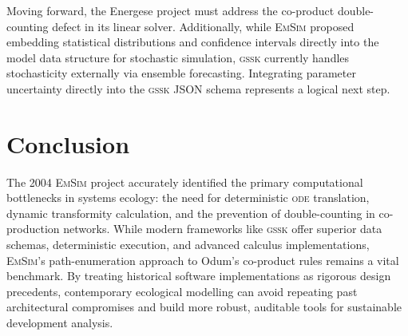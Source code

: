 \documentclass[3p,times,authoryear]{elsarticle}
\newcommand{\gssk}{\textsc{gssk}}
\newcommand{\emsim}{\textsc{EmSim}}
\begin{document}
Moving forward, the Energese project must address the co-product double-counting defect in its linear solver. Additionally, while \emsim{} proposed embedding statistical distributions and confidence intervals directly into the model data structure for stochastic simulation, \gssk{} currently handles stochasticity externally via ensemble forecasting. Integrating parameter uncertainty directly into the \gssk{} JSON schema represents a logical next step.

\section{Conclusion}
\label{sec:conclusion}

The 2004 \emsim{} project accurately identified the primary computational bottlenecks in systems ecology: the need for deterministic \textsc{ode} translation, dynamic transformity calculation, and the prevention of double-counting in co-production networks. While modern frameworks like \gssk{} offer superior data schemas, deterministic execution, and advanced calculus implementations, \emsim's path-enumeration approach to Odum's co-product rules remains a vital benchmark. By treating historical software implementations as rigorous design precedents, contemporary ecological modelling can avoid repeating past architectural compromises and build more robust, auditable tools for sustainable development analysis.
\end{document}
